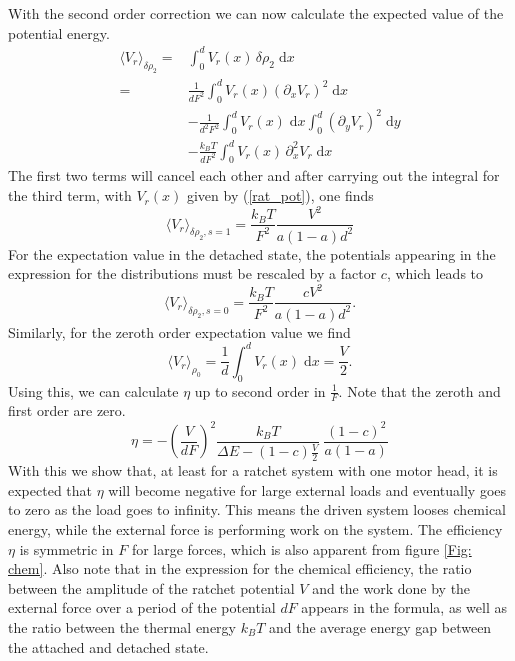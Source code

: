 \documentclass[aps,pre,twocolumn,showpacs,showkeys,a4paper]{revtex4}
\newcommand{\rmd}{{\mathrm d}}
\begin{document}
With the second order correction we can now calculate the expected value of the potential energy.
\begin{align*}
\langle V_r \rangle_{\delta\rho_2} 
=& \int_0^d V_r(x) \, \delta\rho_2 \; \rmd x \\
=& \frac{1}{d F^2} \int_0^d V_r(x) \left(\partial_x V_r \right)^2 \; \rmd x  \\
&- \frac{1}{d^2 F^2} \int_0^d V_r(x) \; \rmd x \int_0^d \left( \partial_y V_r \right)^2 \; \rmd y \\
&- \frac{k_B T}{d F^2} \int_0^d V_r(x) \, \partial_x^2 V_r \; \rmd x
\end{align*}
The first two terms will cancel each other and after carrying out the integral for the third term, with $V_r(x)$ given by (\ref{rat_pot}), one finds 
\begin{equation}
\langle V_r \rangle_{ \delta\rho_2, s=1} = \frac{k_B T}{F^2} \frac{V^2}{a \left(1-a\right) d^2 }
\end{equation}
For the expectation value in the detached state, the potentials appearing in the expression for the distributions must be rescaled by a factor $c$, which leads to
\begin{equation}
\langle V_r \rangle_{\delta\rho_2, s=0} = \frac{k_B T}{F^2} \frac{c V^2}{a \left(1-a\right) d^2 } .
\end{equation}
Similarly, for the zeroth order expectation value we find
\begin{equation}
\langle V_r \rangle_{\rho_0} = \frac{1}{d} \int_0^d V_r(x) \; \rmd x = \frac{V}{2} .
\end{equation}
Using this, we can calculate $\eta$ up to second order in $\frac{1}{F}$. 
Note that the zeroth and first order are zero.
\begin{equation}
\eta = -\left( \frac{V}{d F} \right)^2 \frac{k_B T} { \Delta E - (1-c) \frac{V}{2} } \; \frac{ \left(1-c\right)^2 }{ a (1-a) }
\end{equation}
With this we show that, at least for a ratchet system with one motor head, it is expected that $\eta$ will become negative for large external loads and eventually goes to zero as the load goes to infinity. 
This means the driven system looses chemical energy, while the external force is performing work on the system. 
The efficiency $\eta$ is symmetric in $F$ for large forces, which is also apparent from figure \ref{Fig: chem}. 
Also note that in the expression for the chemical efficiency, the ratio between the amplitude of the ratchet potential $V$ and the work done by the external force over a period of the potential $d F$ appears in the formula, as well as the ratio between the thermal energy $k_B T$ and the average energy gap between the attached and detached state. 
\end{document}
